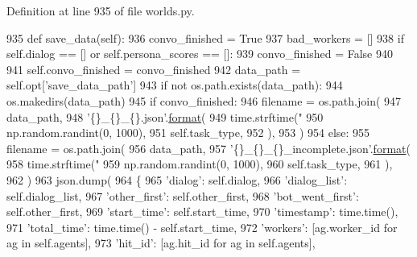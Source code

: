 Definition at line 935 of file worlds.\+py.


\begin{DoxyCode}
935     \textcolor{keyword}{def }save\_data(self):
936         convo\_finished = \textcolor{keyword}{True}
937         bad\_workers = []
938         \textcolor{keywordflow}{if} self.dialog == [] \textcolor{keywordflow}{or} self.persona\_scores == []:
939             convo\_finished = \textcolor{keyword}{False}
940 
941         self.convo\_finished = convo\_finished
942         data\_path = self.opt[\textcolor{stringliteral}{'save\_data\_path'}]
943         \textcolor{keywordflow}{if} \textcolor{keywordflow}{not} os.path.exists(data\_path):
944             os.makedirs(data\_path)
945         \textcolor{keywordflow}{if} convo\_finished:
946             filename = os.path.join(
947                 data\_path,
948                 \textcolor{stringliteral}{'\{\}\_\{\}\_\{\}.json'}.\hyperlink{namespaceparlai_1_1chat__service_1_1services_1_1messenger_1_1shared__utils_a32e2e2022b824fbaf80c747160b52a76}{format}(
949                     time.strftime(\textcolor{stringliteral}{"%
950                     np.random.randint(0, 1000),
951                     self.task\_type,
952                 ),
953             )
954         \textcolor{keywordflow}{else}:
955             filename = os.path.join(
956                 data\_path,
957                 \textcolor{stringliteral}{'\{\}\_\{\}\_\{\}\_incomplete.json'}.\hyperlink{namespaceparlai_1_1chat__service_1_1services_1_1messenger_1_1shared__utils_a32e2e2022b824fbaf80c747160b52a76}{format}(
958                     time.strftime(\textcolor{stringliteral}{"%
959                     np.random.randint(0, 1000),
960                     self.task\_type,
961                 ),
962             )
963         json.dump(
964             \{
965                 \textcolor{stringliteral}{'dialog'}: self.dialog,
966                 \textcolor{stringliteral}{'dialog\_list'}: self.dialog\_list,
967                 \textcolor{stringliteral}{'other\_first'}: self.other\_first,
968                 \textcolor{stringliteral}{'bot\_went\_first'}: self.other\_first,
969                 \textcolor{stringliteral}{'start\_time'}: self.start\_time,
970                 \textcolor{stringliteral}{'timestamp'}: time.time(),
971                 \textcolor{stringliteral}{'total\_time'}: time.time() - self.start\_time,
972                 \textcolor{stringliteral}{'workers'}: [ag.worker\_id \textcolor{keywordflow}{for} ag \textcolor{keywordflow}{in} self.agents],
973                 \textcolor{stringliteral}{'hit\_id'}: [ag.hit\_id \textcolor{keywordflow}{for} ag \textcolor{keywordflow}{in} self.agents],
}}
\end{DoxyCode}
